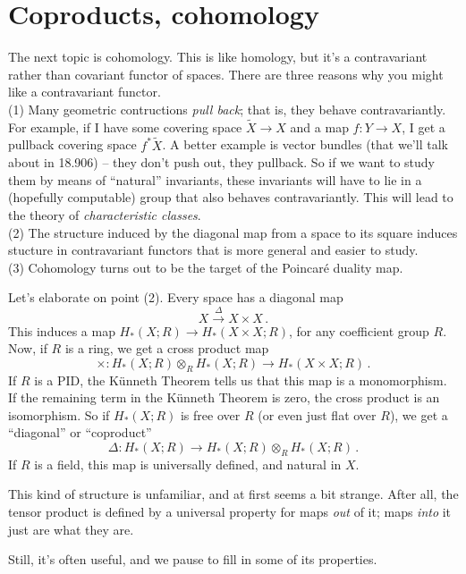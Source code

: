 \section{Coproducts, cohomology}

The next topic is cohomology. This is like homology, but it's a
contravariant rather than covariant functor of spaces. There are three reasons
why you might like a contravariant functor. \\
(1) Many geometric contructions {\em pull back}; that is, they behave
contravariantly.
For example, if I have some covering space $\widetilde{X}\to X$ and a map $f:Y\to X$, I get a pullback covering space $f^{\ast}\widetilde{X}$. A better example is vector bundles (that we'll talk about in 18.906) -- they don't push out, they pullback. 
 So if we want to study them by means of ``natural''
invariants, these invariants will have to lie in a (hopefully computable)
group that also behaves contravariantly. 
This will lead to the theory of \emph{characteristic classes}.\\
(2) The structure induced by the diagonal map from a space to its square
induces stucture in contravariant functors that is more general and easier
to study. \\
(3)  Cohomology turns out to be the target of the Poincar\'{e} duality map.

Let's elaborate on point (2). Every space has a diagonal map 
\[
X\xrightarrow{\Delta}X\times X\,.
\]
This induces a map $ H_\ast(X;R)\to H_\ast(X\times X;R)$, for any coefficient
group $R$. Now, if $R$ is a ring, we get a cross product map 
\[
\times:H_\ast(X;R)\otimes_R H_\ast(X;R)\to H_\ast(X\times X;R)\,.
\]
If $R$ is a PID, the K\"unneth Theorem tells us that this map is
a monomorphism. If the remaining term in the K\"unneth Theorem is zero, 
the cross product
is an isomorphism. So if $H_*(X;R)$ is free over $R$ (or even just flat over
$R$), we get a ``diagonal'' or ``coproduct''
\[
\Delta:H_\ast(X;R)\to H_\ast(X;R)\otimes_R H_\ast(X;R)\,.
\]
If $R$ is a field, this map is universally defined, and natural in $X$.

This kind of structure is unfamiliar, and at first seems a bit strange.
After all, the tensor product is defined by a universal property for maps
{\em out} of it; maps {\em into} it just are what they are.

Still, it's often useful, and we pause to fill in some of its properties.

